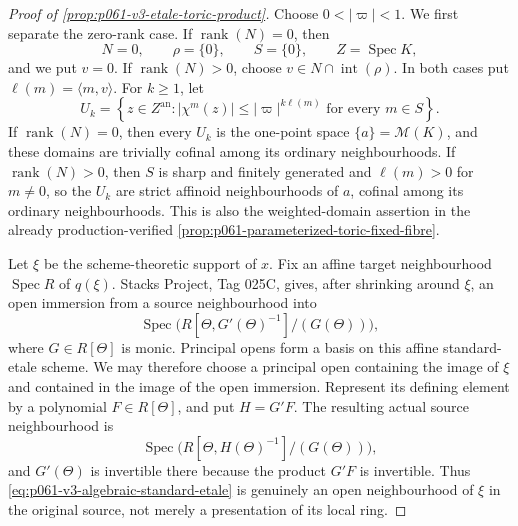 \begin{proof}[Proof of \cref{prop:p061-v3-etale-toric-product}]
Choose \(0<|\varpi|<1\). We first separate the zero-rank case. If
\(\operatorname{rank}(N)=0\), then
\[
 N=0,\qquad \rho=\{0\},\qquad S=\{0\},\qquad
 Z=\operatorname{Spec}K,
\]
and we put \(v=0\). If \(\operatorname{rank}(N)>0\), choose
\(v\in N\cap\operatorname{int}(\rho)\). In both cases put
\(\ell(m)=\langle m,v\rangle\). For \(k\geq1\), let
\begin{equation}\label{eq:p061-v3-weighted-toric-domain}
 U_k=\left\{z\in Z^{\mathrm{an}}:
  |\chi^m(z)|\leq|\varpi|^{k\ell(m)}
  \text{ for every }m\in S\right\}.
\end{equation}
If \(\operatorname{rank}(N)=0\), then every \(U_k\) is the one-point space
\(\{a\}=\mathcal M(K)\), and these domains are trivially cofinal among its
ordinary neighbourhoods. If \(\operatorname{rank}(N)>0\), then \(S\) is
sharp and finitely generated and \(\ell(m)>0\) for \(m\neq0\), so the
\(U_k\) are strict affinoid neighbourhoods of \(a\), cofinal among its
ordinary neighbourhoods. This is also the weighted-domain assertion in the
already production-verified
\cref{prop:p061-parameterized-toric-fixed-fibre}.

Let \(\xi\) be the scheme-theoretic support of \(x\). Fix an affine
target neighbourhood \(\operatorname{Spec}R\) of \(q(\xi)\). Stacks
Project, Tag 025C, gives, after shrinking around \(\xi\), an open immersion
from a source neighbourhood into
\[
 \operatorname{Spec}\bigl(R[\Theta,G'(\Theta)^{-1}]/(G(\Theta))\bigr),
\]
where \(G\in R[\Theta]\) is monic. Principal opens form a basis on this
affine standard-etale scheme. We may therefore choose a principal open
containing the image of \(\xi\) and contained in the image of the open
immersion. Represent its defining element by a polynomial
\(F\in R[\Theta]\), and put \(H=G'F\). The resulting actual source
neighbourhood is
\begin{equation}\label{eq:p061-v3-algebraic-standard-etale}
 \operatorname{Spec}
 \bigl(R[\Theta,H(\Theta)^{-1}]/(G(\Theta))\bigr),
\end{equation}
and \(G'(\Theta)\) is invertible there because the product \(G'F\) is
invertible. Thus \eqref{eq:p061-v3-algebraic-standard-etale} is genuinely
an open neighbourhood of \(\xi\) in the original source, not merely a
presentation of its local ring.


\end{proof}

